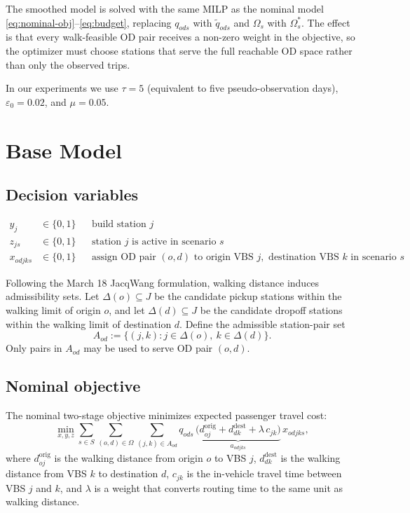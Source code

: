 \documentclass[11pt]{article}
\theoremstyle{definition}
\begin{document}
The smoothed model is solved with the same MILP as the nominal model
\eqref{eq:nominal-obj}--\eqref{eq:budget}, replacing $q_{ods}$ with $\tilde{q}_{ods}$
and $\Omega_s$ with $\Omega^*_s$.  The effect is that every walk-feasible OD
pair receives a non-zero weight in the objective, so the optimizer must choose
stations that serve the full reachable OD space rather than only the observed
trips.

In our experiments we use $\tau = 5$ (equivalent to five pseudo-observation days),
$\varepsilon_0 = 0.02$, and $\mu = 0.05$.
\section{Base Model}
\label{sec:base}

\subsection{Decision variables}

\begin{align*}
	y_j       & \in \{0,1\} &  & \text{build station } j                                \\
	z_{js}    & \in \{0,1\} &  & \text{station } j \text{ is active in scenario } s     \\
	x_{odjks} & \in \{0,1\} &  & \text{assign OD pair } (o,d) \text{ to origin VBS } j,
	\text{ destination VBS } k \text{ in scenario } s
\end{align*}

Following the March 18 JacqWang formulation, walking distance induces
admissibility sets.  Let $\Delta(o) \subseteq J$ be the candidate pickup
stations within the walking limit of origin $o$, and let $\Delta(d) \subseteq
	J$ be the candidate dropoff stations within the walking limit of destination
$d$.  Define the admissible station-pair set
\[
	A_{od}
	:=
	\{(j,k) : j \in \Delta(o),\ k \in \Delta(d)\}.
\]
Only pairs in $A_{od}$ may be used to serve OD pair $(o,d)$.

\subsection{Nominal objective}

The nominal two-stage objective minimizes expected passenger travel cost:
\begin{equation}
	\min_{x,y,z}
	\sum_{s \in S} \sum_{(o,d) \in \Omega} \sum_{(j,k)\in A_{od}}
	q_{ods}\,
	\underbrace{\bigl(d^{\mathrm{orig}}_{oj} + d^{\mathrm{dest}}_{dk} + \lambda\,c_{jk}\bigr)}_{a_{odjks}}\,
	x_{odjks},
	\label{eq:nominal-obj}
\end{equation}
where $d^{\mathrm{orig}}_{oj}$ is the walking distance from origin $o$ to VBS $j$,
$d^{\mathrm{dest}}_{dk}$ is the walking distance from VBS $k$ to destination $d$,
$c_{jk}$ is the in-vehicle travel time between VBS $j$ and $k$, and $\lambda$
is a weight that converts routing time to the same unit as walking distance.
\end{document}
